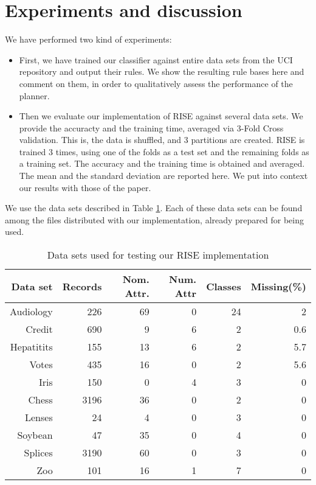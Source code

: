 \documentclass[a4paper]{article}
\begin{document}
\section{Experiments and discussion}

We have performed two kind of experiments:
\begin{itemize}
	\item First, we have trained our classifier against entire data sets from the UCI repository and output their rules. We show the resulting rule bases here and comment on them, in order to qualitatively assess the performance of the planner.
	\item Then we evaluate our implementation of RISE against several data sets. We provide the accuracty and the training time, averaged via 3-Fold Cross validation. This is, the data is shuffled, and 3 partitions are created. RISE is trained 3 times, using one of the folds as a test set and the remaining folds as a training set. The accuracy and the training time is obtained and averaged. The mean and the standard deviation are reported here. We put into context our results with those of the paper.
\end{itemize}

We use the data sets described in Table \ref{tab:datasets}. Each of these data sets can be found among the files distributed with our implementation, already prepared for being used.

\begin{table}[htbp]
\centering
\caption{Data sets used for testing our RISE implementation}
\begin{tabular}{|r|r|r|r|r|r|}
\hline
\textbf{Data set} & \textbf{Records} & \textbf{Nom. Attr.} & \textbf{Num. Attr} & \textbf{Classes} & \textbf{Missing(\%)} \\ \hline
Audiology & 226 & 69 & 0 & 24 & 2 \\ \hline
Credit & 690 & 9 & 6 & 2 & 0.6 \\ \hline
Hepatitits & 155 & 13 & 6 & 2 & 5.7 \\ \hline
Votes & 435 & 16 & 0 & 2 & 5.6 \\ \hline
Iris & 150 & 0 & 4 & 3 & 0 \\ \hline
Chess & 3196 & 36 & 0 & 2 & 0 \\ \hline
Lenses & 24 & 4 & 0 & 3 & 0 \\ \hline
Soybean & 47 & 35 & 0 & 4 & 0 \\ \hline
Splices & 3190 & 60 & 0 & 3 & 0 \\ \hline
Zoo & 101 & 16 & 1 & 7 & 0 \\ \hline
\end{tabular}
\label{tab:datasets}
\end{table}
\end{document}

